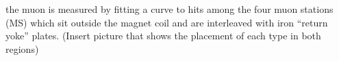 the muon is measured by fitting a curve to hits among the four muon stations (MS) which sit outside the magnet coil and are interleaved with iron “return yoke” plates.  
(Insert picture that shows the placement of each type in both regions)  


